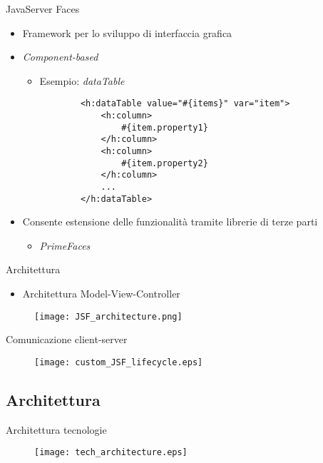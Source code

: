 \begin{frame}[fragile]{JavaServer Faces}

\begin{itemize}
\item Framework per lo sviluppo di interfaccia grafica

\vspace{0.8em}

\item \textsl{Component-based}
	\begin{itemize}
	\item Esempio: \textsl{dataTable}
		\begin{lstlisting}
		<h:dataTable value="#{items}" var="item">
		    <h:column>
		        #{item.property1}
		    </h:column>
		    <h:column>
		        #{item.property2}
		    </h:column>
		    ...
		</h:dataTable>
		\end{lstlisting}
	\end{itemize}

\vspace{0.8em}

\item Consente estensione delle funzionalità tramite librerie di terze parti
	\begin{itemize}
	\item \textsl{PrimeFaces}
	\end{itemize}
\end{itemize}

\end{frame}


\begin{frame}{Architettura}

\begin{itemize}
\item Architettura Model-View-Controller
\end{itemize}

\begin{figure}
	\centering
	\texttt{[image: JSF\_architecture.png]}
\end{figure}

\end{frame}


\begin{frame}{Comunicazione client-server}
\begin{figure}
	\centering
	\texttt{[image: custom\_JSF\_lifecycle.eps]}
\end{figure}

\end{frame}


\subsection{Architettura}

\begin{frame}{Architettura tecnologie}
\begin{figure}
	\centering
	\texttt{[image: tech\_architecture.eps]}
\end{figure}
\end{frame}



